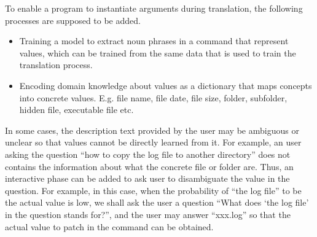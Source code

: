 To enable a program to instantiate arguments during translation, the following processes are supposed to be added. 
\begin{itemize}\itemsep-1pt
\item Training a model to extract noun phrases in a command that represent values, which can be trained from the same data that is used to train the translation process.
\item Encoding domain knowledge about values as a dictionary that maps concepts into concrete values. E.g. file name, file date, file size, folder, subfolder, hidden file, executable file etc.
\end{itemize}

In some cases, the description text provided by the user may be ambiguous or unclear so that values cannot be directly learned from it. For example, an user asking the question ``how to copy the log file to another directory'' does not contains the information about what the concrete file or folder are. Thus, an interactive phase can be added to ask user to disambiguate the value in the question. For example, in this case, when the probability of ``the log file'' to be the actual value is low, we shall ask the user a question ``What does `the log file' in the question stands for?'', and the user may answer ``xxx.log'' so that the actual value to patch in the command can be obtained.
